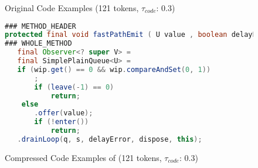 \begin{figure}[!h]
\begin{tcolorbox}
Original Code Examples (121 tokens, $\tau_{code}$: 0.3)
\begin{lstlisting}[language=Java,frame=single,framerule=0pt]
### METHOD_HEADER 
protected final void fastPathEmit ( U value , boolean delayError , Disposable dispose )
### WHOLE_METHOD  
   final Observer<? super V> = 
   final SimplePlainQueue<U> = 
   if (wip.get() == 0 && wip.compareAndSet(0, 1)) 
       ;
       if (leave(-1) == 0) 
           return;    
    else 
       .offer(value);
       if (!enter()) 
           return;
   .drainLoop(q, s, delayError, dispose, this);
\end{lstlisting}
\end{tcolorbox}
\caption{Compressed Code Examples  of \taskthree (121 tokens, $\tau_{code}$: 0.3)}
\end{figure}


